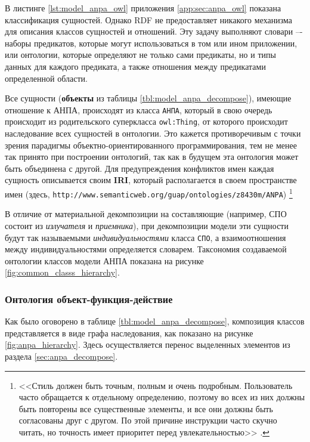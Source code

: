 В листинге \ref{lst:model_anpa_owl} приложения \ref{app:sec:anpa_owl} показана
классификация сущностей.
%
Однако RDF не предоставляет никакого механизма для описания классов сущностей и
отношений. Эту задачу выполняют словари –- наборы предикатов, которые могут
использоваться в том или ином приложении, или онтологии, которые определяют не только
сами предикаты, но и типы данных для каждого предиката, а также отношения между
предикатами определенной области.

Все сущности (\textbf{объекты} из таблицы \ref{tbl:model_anpa_decompose}), имеющие отношение к АНПА, происходят из класса \texttt{АНПА},
который в свою очередь происходит из родительского суперкласса \texttt{owl:Thing},
от которого происходит наследование всех сущностей в онтологии.
Это кажется противоречивым с точки зрения парадигмы объектно-ориентированного программирования,
тем не менее так принято при построении онтологий, так как в будущем эта онтология может быть объединена с другой.
Для предупреждения конфликтов имен каждая сущность описывается своим \textbf{IRI},
который располагается в своем пространстве имен (здесь, \texttt{http://www.semanticweb.org/guap/ontologies/z8430m/ANPA})
\cite[раздел 2.1]{journal:vestnik_vgtu:shapkin}\footnote{%
<<Стиль должен быть точным, полным и очень подробным. Пользователь часто обращается к отдельному определению,
    поэтому во всех из них должны быть повторены все существенные элементы, и все они должны быть согласованы друг с другом.
    По этой причине инструкции часто скучно читать, но точность имеет приоритет перед увлекательностью>> \cite[гл.~6]{book:bruks:myth_mount_man}.
}

В отличие от материальной декомпозиции на составляющие (например, СПО состоит из \textit{излучателя} и \textit{приемника}),
при декомпозиции модели эти сущности будут так называемыми \textit{индивидуальностями} класса \texttt{СПО},
а взаимоотношения между индивидуальностями определяется словарем.
Таксономия создаваемой онтологии классов модели АНПА показана на рисунке \ref{fig:common_classs_hierarchy}.

\subsubsection{Онтология объект-функция-действие}
Как было оговорено в таблице \ref{tbl:model_anpa_decompose}, композиция классов представляется в виде графа наследования,
как показано на рисунке \ref{fig:anpa_hierarchy}. Здесь осуществляется перенос выделенных элементов из раздела \ref{sec:anpa_decompose}.


